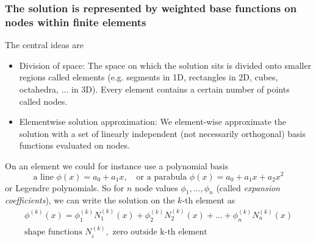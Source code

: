 \subsubsection{The solution is represented by weighted base functions on nodes within finite elements}
The central ideas are
\begin{itemize}
    \item \textcolor{blue1}{Division of space:} The space on which the solution sits is divided onto smaller regions called elements (e.g. segments in 1D, rectangles in 2D, cubes, octahedra, ... in 3D).  Every element contains a certain number of points called nodes.
    \item \textcolor{blue1}{Elementwise solution approximation:} We element-wise approximate the solution with a set of linearly independent (not necessarily orthogonal) basis functions evaluated on nodes.
\end{itemize}
On an element we could for instance use a polynomial basis
\begin{equation}
    \text{a line } \phi(x) = a_0 + a_1 x, \quad \text{or a parabula } \phi(x) = a_0 + a_1 x + a_2 x^2
\end{equation}
or Legendre polynomials.
So for $n$ node values $\phi_1,\dots,\phi_n$ (called \textit{expansion coefficients}), we can write the solution on the $k$-th element as
\begin{equation}
    \begin{gathered}
        \phi^{(k)}(x) = \phi_1^{(k)} N_1^{(k)}(x) + \phi_2^{(k)} N_2^{(k)}(x) + \dots + \phi_n^{(k)} N_n^{(k)}(x) \\
        \text{shape functions } N_i^{(k)}, \text{ zero outside k-th element}
    \end{gathered}
\end{equation}


